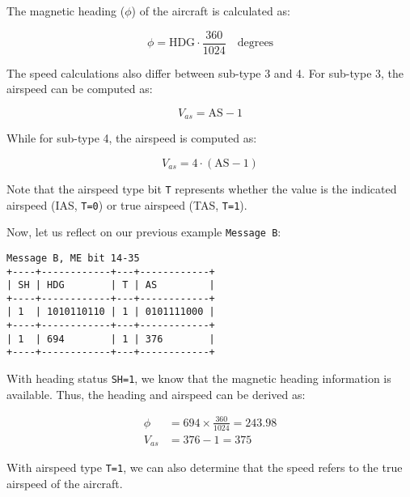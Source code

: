 The magnetic heading ($\phi$) of the aircraft is calculated as:

\begin{equation}
  \phi = \mathrm{HDG} \cdot \frac{360}{1024}  \quad \text{degrees}
\end{equation}

The speed calculations also differ between sub-type 3 and 4. For sub-type 3, the airspeed can be computed as:

\begin{equation}
  V_{as} = \mathrm{AS} - 1
\end{equation}

While for sub-type 4, the airspeed is computed as:

\begin{equation}
  V_{as} = 4 \cdot (\mathrm{AS} - 1)
\end{equation}

Note that the airspeed type bit \texttt{T} represents whether the value is the indicated airspeed (IAS, \texttt{T=0}) or true airspeed (TAS, \texttt{T=1}).

Now, let us reflect on our previous example \texttt{Message B}:

\begin{verbatim}
Message B, ME bit 14-35
+----+------------+---+------------+
| SH | HDG        | T | AS         |
+----+------------+---+------------+
| 1  | 1010110110 | 1 | 0101111000 |
+----+------------+---+------------+
| 1  | 694        | 1 | 376        |
+----+------------+---+------------+
\end{verbatim}

With heading status \texttt{SH=1}, we know that the magnetic heading information is available. Thus, the heading and airspeed can be derived as:

\begin{align}
  \phi &= 694 \times \frac{360}{1024} = 243.98 \\
  V_{as} &= 376 - 1 = 375
\end{align}

With airspeed type \texttt{T=1}, we can also determine that the speed refers to the true airspeed of the aircraft.


